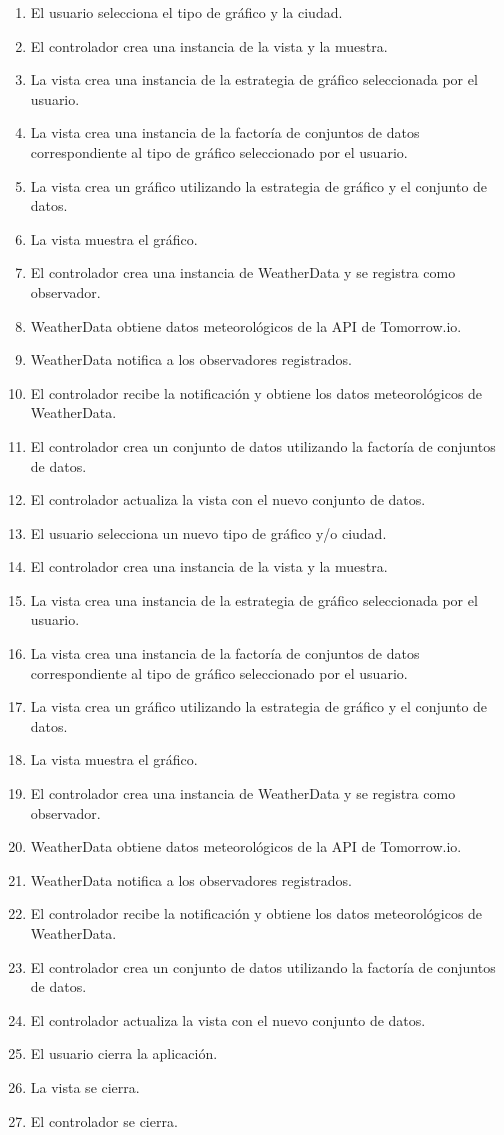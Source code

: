 \documentclass{article}
\begin{document}
\begin{enumerate}
  \item El usuario selecciona el tipo de gráfico y la ciudad.
  \item El controlador crea una instancia de la vista y la muestra.
  \item La vista crea una instancia de la estrategia de gráfico seleccionada por el usuario.
  \item La vista crea una instancia de la factoría de conjuntos de datos correspondiente al tipo de gráfico seleccionado por el usuario.
  \item La vista crea un gráfico utilizando la estrategia de gráfico y el conjunto de datos.
  \item La vista muestra el gráfico.
  \item El controlador crea una instancia de WeatherData y se registra como observador.
  \item WeatherData obtiene datos meteorológicos de la API de Tomorrow.io.
  \item WeatherData notifica a los observadores registrados.
  \item El controlador recibe la notificación y obtiene los datos meteorológicos de WeatherData.
  \item El controlador crea un conjunto de datos utilizando la factoría de conjuntos de datos.
  \item El controlador actualiza la vista con el nuevo conjunto de datos.
  \item El usuario selecciona un nuevo tipo de gráfico y/o ciudad.
  \item El controlador crea una instancia de la vista y la muestra.
  \item La vista crea una instancia de la estrategia de gráfico seleccionada por el usuario.
  \item La vista crea una instancia de la factoría de conjuntos de datos correspondiente al tipo de gráfico seleccionado por el usuario.
  \item La vista crea un gráfico utilizando la estrategia de gráfico y el conjunto de datos.
  \item La vista muestra el gráfico.
  \item El controlador crea una instancia de WeatherData y se registra como observador.
  \item WeatherData obtiene datos meteorológicos de la API de Tomorrow.io.
  \item WeatherData notifica a los observadores registrados.
  \item El controlador recibe la notificación y obtiene los datos meteorológicos de WeatherData.
  \item El controlador crea un conjunto de datos utilizando la factoría de conjuntos de datos.
  \item El controlador actualiza la vista con el nuevo conjunto de datos.
  \item El usuario cierra la aplicación.
  \item La vista se cierra.
  \item El controlador se cierra.
\end{enumerate}
\end{document}
